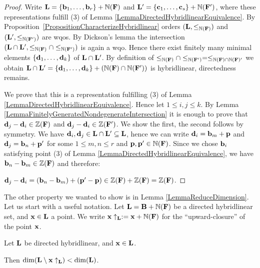 \begin{proof}
Write \(\mathbf{L}=\{\mathbf{b}_1, \dots, \mathbf{b}_r\}+\mathbb{N}(\mathbf{F})\) and \(\mathbf{L}'=\{\mathbf{c}_1, \dots, \mathbf{c}_s\}+\mathbb{N}(\mathbf{F}')\), where these representations fulfill (3) of Lemma \ref{LemmaDirectedHybridlinearEquivalence}.
By Proposition~\ref{PropositionCharacterizeHybridlinear} orders $(\mathbf{L}, \leq_{\mathbb{N}(\mathbf{F})})$ and $(\mathbf{L}', \leq_{\mathbb{N}(\mathbf{F'})})$ are wqos.
By Dickson's lemma the intersection \((\mathbf{L} \cap \mathbf{L}', \leq_{\mathbb{N}(\mathbf{F})} \cap \leq_{\mathbb{N}(\mathbf{F}')})\) is again a wqo. Hence there exist finitely many minimal elements \(\{\mathbf{d}_1, \dots, \mathbf{d}_k\}\) of \(\mathbf{L} \cap \mathbf{L}'\). By definition of \(\leq_{\mathbb{N}(\mathbf{F})} \cap \leq_{\mathbb{N}(\mathbf{F}')}=\leq_{\mathbb{N}(\mathbf{F}) \cap \mathbb{N}(\mathbf{F})'}\) we obtain \(\mathbf{L} \cap \mathbf{L}'=\{\mathbf{d}_1, \dots, \mathbf{d}_k\}+(\mathbb{N}(\mathbf{F}) \cap \mathbb{N}(\mathbf{F}'))\) is hybridlinear, directedness remains. 

We prove that this is a representation fulfilling (3) of Lemma \ref{LemmaDirectedHybridlinearEquivalence}. Hence let \(1 \leq i,j \leq k\). By Lemma \ref{LemmaFinitelyGeneratedNondegenerateIntersection} it is enough to prove that \(\mathbf{d}_j - \mathbf{d}_i \in \mathbb{Z}(\mathbf{F})\) and \(\mathbf{d}_j - \mathbf{d}_i \in \mathbb{Z}(\mathbf{F}')\). We show the first, the second follows by symmetry. We have \(\mathbf{d}_i, \mathbf{d}_j \in \mathbf{L} \cap \mathbf{L}' \subseteq \mathbf{L}\), hence we can write \(\mathbf{d}_i=\mathbf{b}_m+\mathbf{p}\) and \(\mathbf{d}_j=\mathbf{b}_n + \mathbf{p}'\) for some \(1 \leq m,n \leq r\) and \(\mathbf{p}, \mathbf{p}' \in \mathbb{N}(\mathbf{F})\). Since we chose $\mathbf{b}_i$ satisfying point (3) of Lemma \ref{LemmaDirectedHybridlinearEquivalence}, we have $\mathbf{b}_n - \mathbf{b}_m \in \mathbb{Z}(\mathbf{F})$ and therefore:

\(\mathbf{d}_j-\mathbf{d}_i=(\mathbf{b}_n - \mathbf{b}_m)+(\mathbf{p}' - \mathbf{p}) \in \mathbb{Z}(\mathbf{F})+\mathbb{Z}(\mathbf{F})=\mathbb{Z}(\mathbf{F})\).
\end{proof}

The other property we wanted to show is in Lemma \ref{LemmaReduceDimension}. Let us start with a useful notation. Let \(\mathbf{L}=\mathbf{B}+\mathbb{N}(\mathbf{F})\) be a directed hybridlinear set, and \(\mathbf{x} \in \mathbf{L}\) a point. We write \(\mathbf{x} \uparrow_{\mathbf{L}}:=\mathbf{x}+\mathbb{N}(\mathbf{F})\) for the ``upward-closure'' of the point \(\mathbf{x}\).

\begin{lemma}
Let \(\mathbf{L}\) be directed hybridlinear, and \(\mathbf{x} \in \mathbf{L}\). 

Then \(\dim(\mathbf{L} \setminus \mathbf{x} \uparrow_{\mathbf{L}})<\dim(\mathbf{L})\). \label{LemmaReduceDimension}
\end{lemma}


